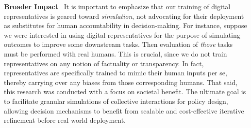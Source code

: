\textbf{Broader Impact}~
It is important to emphasize that our  training of digital representatives is geared toward \textit{simulation}, not advocating for their deployment as substitutes for human accountability in decision-making. For instance, suppose we were interested in using digital representatives for the purpose of simulating outcomes to improve some downstream tasks. Then evaluation of \textit{those} tasks must be performed with real humans. This is crucial, since we do not train representatives on any notion of factuality or transparency. In fact, representatives are specifically trained to mimic their human inputs per se, thereby carrying over any biases from those corresponding humans. That said, this research was conducted with a focus on societal benefit. The ultimate goal is to facilitate granular simulations of collective interactions for policy design, allowing decision mechanisms to benefit from scalable and cost-effective iterative refinement before real-world deployment.